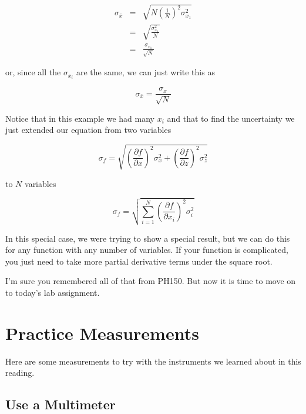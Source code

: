 \begin{eqnarray*}
	\sigma _{\bar{x}} &=&\sqrt{N\left( \frac{1}{N}\right) ^{2}\sigma _{x_{1}}^{2}} \\
                      &=&\sqrt{\frac{\sigma _{x_{1}}^{2}}{N}} \\
                      &=&\frac{\sigma _{x_{1}}}{\sqrt{N}}
\end{eqnarray*}

or, since all the $\sigma _{x_{i}}$ are the same, we can just write this as 

\begin{equation*}
	\sigma _{\bar{x}}=\frac{\sigma _{x}}{\sqrt{N}}
\end{equation*}

Notice that in this example we had many $x_{i}$ and that to find the uncertainty we just extended our equation from two variables

\begin{equation*}
	\sigma _{f}=\sqrt{\left( \frac{\partial f}{\partial x}\right) ^{2}\sigma_{x}^{2}+\left( \frac{\partial f}{\partial z}\right) ^{2}\sigma _{z}^{2}}
\end{equation*}

to $N$ variables

\begin{equation*}
	\sigma _{f}=\sqrt{\sum_{i=1}^{N}\left( \frac{\partial f}{\partial x_{i}}\right) ^{2}\sigma _{i}^{2}}
\end{equation*}

In this special case, we were trying to show a special result, but we can do this for any function with any number of variables. If your function is complicated, you just need to take more partial derivative terms under the square root.

I'm sure you remembered all of that from PH150. But now it is time to move on to today's lab assignment.
\vfill
\pagebreak
\section{Practice Measurements}
Here are some measurements to try with the instruments we learned about in this reading.

\subsection{Use a Multimeter}

